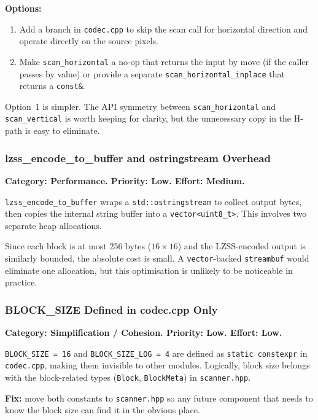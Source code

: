 \textbf{Options:}
\begin{enumerate}
  \item Add a branch in \texttt{codec.cpp} to skip the scan call for horizontal direction
        and operate directly on the source pixels.
  \item Make \texttt{scan\_horizontal} a no-op that returns the input by move (if the caller
        passes by value) or provide a separate \texttt{scan\_horizontal\_inplace} that returns
        a \texttt{const\&}.
\end{enumerate}
Option~1 is simpler.
The API symmetry between \texttt{scan\_horizontal} and \texttt{scan\_vertical} is worth
keeping for clarity, but the unnecessary copy in the H-path is easy to eliminate.

\subsubsection{lzss\_encode\_to\_buffer and ostringstream Overhead}

\textbf{Category: Performance. Priority: Low. Effort: Medium.}

\texttt{lzss\_encode\_to\_buffer} wraps a \texttt{std::ostringstream} to collect output
bytes, then copies the internal string buffer into a \texttt{vector\textless uint8\_t\textgreater}.
This involves two separate heap allocations.

Since each block is at most 256 bytes ($16 \times 16$) and the LZSS-encoded output is
similarly bounded, the absolute cost is small.
A \texttt{vector}-backed \texttt{streambuf} would eliminate one allocation, but this
optimisation is unlikely to be noticeable in practice.

\subsubsection{BLOCK\_SIZE Defined in codec.cpp Only}

\textbf{Category: Simplification / Cohesion. Priority: Low. Effort: Low.}

\texttt{BLOCK\_SIZE = 16} and \texttt{BLOCK\_SIZE\_LOG = 4} are defined as
\texttt{static constexpr} in \texttt{codec.cpp}, making them invisible to other modules.
Logically, block size belongs with the block-related types (\texttt{Block},
\texttt{BlockMeta}) in \texttt{scanner.hpp}.

\textbf{Fix:} move both constants to \texttt{scanner.hpp} so any future component
that needs to know the block size can find it in the obvious place.

